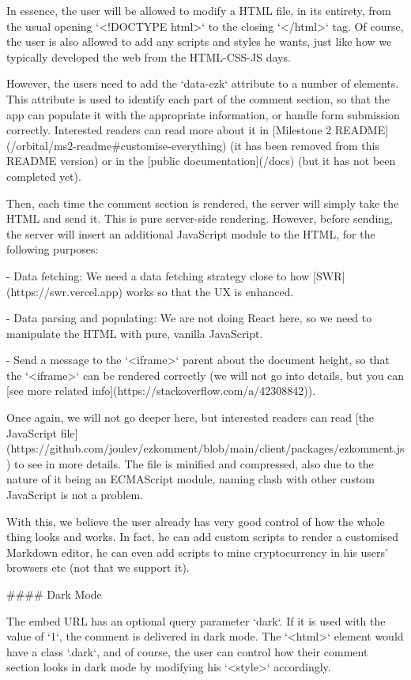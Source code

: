 \documentclass[11pt]{article}
\begin{document}
\begin{markdown}
In essence, the user will be allowed to modify a HTML file, in its entirety, from the usual opening `<!DOCTYPE html>` to the closing `</html>` tag. Of course, the user is also allowed to add any scripts and styles he wants, just like how we typically developed the web from the HTML-CSS-JS days.

However, the users need to add the `data-ezk` attribute to a number of elements. This attribute is used to identify each part of the comment section, so that the app can populate it with the appropriate information, or handle form submission correctly. Interested readers can read more about it in [Milestone 2 README](/orbital/ms2-readme#customise-everything) (it has been removed from this README version) or in the [public documentation](/docs) (but it has not been completed yet).

Then, each time the comment section is rendered, the server will simply take the HTML and send it. This is pure server-side rendering. However, before sending, the server will insert an additional JavaScript module to the HTML, for the following purposes:

- Data fetching: We need a data fetching strategy close to how [SWR](https://swr.vercel.app) works so that the UX is enhanced.

- Data parsing and populating: We are not doing React here, so we need to manipulate the HTML with pure, vanilla JavaScript.

- Send a message to the `<iframe>` parent about the document height, so that the `<iframe>` can be rendered correctly (we will not go into details, but you can [see more related info](https://stackoverflow.com/a/42308842)).

Once again, we will not go deeper here, but interested readers can read [the JavaScript file](https://github.com/joulev/ezkomment/blob/main/client/packages/ezkomment.js) to see in more details.
The file is minified and compressed, also due to the nature of it being an ECMAScript module, naming clash with other custom JavaScript is not a problem.

With this, we believe the user already has very good control of how the whole thing looks and works. In fact, he can add custom scripts to render a customised Markdown editor, he can even add scripts to mine cryptocurrency in his users' browsers etc (not that we support it).

#### Dark Mode

The embed URL has an optional query parameter `dark`. If it is used with the value of `1`, the comment is delivered in dark mode. The `<html>` element would have a class `.dark`, and of course, the user can control how their comment section looks in dark mode by modifying his `<style>` accordingly.


\end{markdown}
\end{document}

